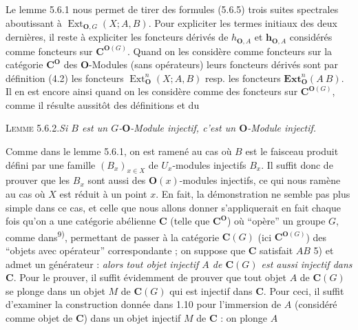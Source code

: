 Le lemme 5.6.1 nous permet de tirer des formules (5.6.5) trois suites
spectrales aboutissant à $\operatorname{Ext}_{{\mathbf O},G}(X;A,B)$. Pour expliciter
les termes initiaux des deux dernières, il reste à expliciter les foncteurs
dérivés de $h_{{\mathbf O},A}$ et $\mathbf h_{{\mathbf O},A}$ considérés comme foncteurs sur
${\mathbf C}^{{\mathbf O}(G)}$.
Quand on les considère comme foncteurs sur la catégorie ${\mathbf C}^{\mathbf O}$ des ${\mathbf O}$-Modules
(sans opérateurs) leurs foncteurs dérivés sont par définition (4.2) les
foncteurs $\operatorname{Ext}_{\mathbf O}^n(X;A,B)$ resp. les foncteurs
$\mathbf{Ext}_{\mathbf O}^n(A\ B)$. Il en est encore ainsi quand on les considère comme
des foncteurs sur ${\mathbf C}^{{\mathbf O}(G)}$, comme il résulte aussitôt des définitions et du

\textsc{Lemme 5.6.2.}\quad \textit{Si $B$ est un $G$-${\mathbf O}$-Module
injectif, c'est un ${\mathbf O}$-Module injectif.}

Comme dans le lemme 5.6.1, on est ramené au cas où $B$ est le faisceau produit
défini par une famille $(B_x)_{x\in X}$ de $U_x$-modules injectifs $B_x$. Il
suffit donc de prouver que les $B_x$ sont aussi des ${\mathbf O}(x)$-modules injectifs,
ce qui nous ramène au cas où $X$ est réduit à un point $x$.
En fait, la démonstration ne semble pas plus simple dans ce cas, et celle que
nous allons donner s'appliquerait en fait chaque fois qu'on a une catégorie
abélienne ${\mathbf C}$ (telle que ${\mathbf C}^{\mathbf O}$) où ``opère'' un groupe $G$, comme
dans\textsuperscript{9)}, permettant de passer à la catégorie ${\mathbf C}(G)$ (ici
${\mathbf C}^{{\mathbf O}(G)}$) des ``objets avec opérateur'' correspondante ; on suppose que ${\mathbf C}$
satisfait $AB$ 5) et admet un générateur : \textit{alors tout objet injectif $A$
de ${\mathbf C}(G)$ est aussi injectif dans ${\mathbf C}$}.
Pour le prouver, il suffit évidemment de prouver que tout objet $A$ de ${\mathbf C}(G)$
se plonge dans un objet $M$ de ${\mathbf C}(G)$ qui est injectif dans ${\mathbf C}$. Pour ceci, il
suffit d'examiner la construction donnée dans 1.10 pour l'immersion de $A$
(considéré comme objet de ${\mathbf C}$) dans un objet injectif $M$ de ${\mathbf C}$ : on plonge
$A$

